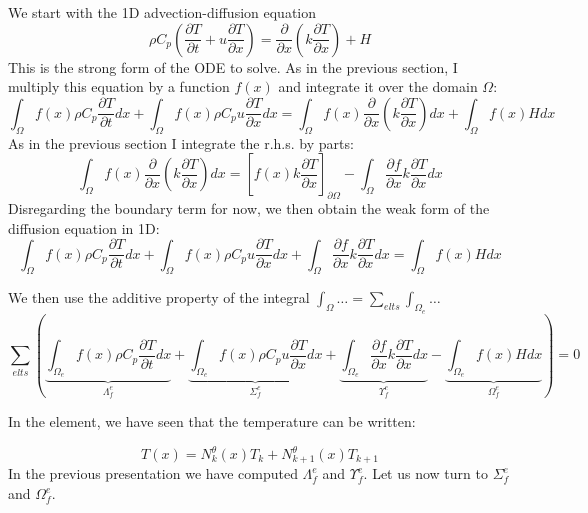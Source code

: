 
We start with the 1D advection-diffusion equation
\begin{equation}
\rho C_p \left( \frac{\partial T}{\partial t} 
+ u \frac{\partial T}{\partial x}
\right)
= \frac{\partial }{\partial x} \left( k \frac{\partial T}{\partial x}  \right)
+H
\end{equation}
This is the {\color{olive}strong form} of the ODE to solve.
As in the previous section, I multiply this equation by a function $f(x)$ and integrate it over 
the domain $\Omega$:
\[
\int_{\Omega} f(x)  \rho C_p\frac{\partial T}{\partial t} dx
+
\int_{\Omega} f(x)  \rho C_p u \frac{\partial T}{\partial x} dx
\!=\!
\int_{\Omega} f(x) \frac{\partial }{\partial x}\! \left(\! k\! \frac{\partial T}{\partial x}\!  \right)\! dx
+
\int_{\Omega} f(x) H dx 
\]
As in the previous section I integrate the r.h.s. by parts:
\[
\int_{\Omega} f(x) \frac{\partial }{\partial x} \left( k \frac{\partial T}{\partial x}  \right) dx
=
\left[
f(x) k \frac{\partial T}{\partial x}
\right]_{\partial \Omega}
-
\int_{\Omega} \frac{\partial f}{\partial x}  k \frac{\partial T}{\partial x}  dx
\]
Disregarding the boundary term for now, 
we then obtain the {\color{olive}weak form} of the diffusion equation in 1D:
\[
\boxed{
\int_{\Omega} f(x) \rho C_p \frac{\partial T}{\partial t} dx
+
\int_{\Omega} f(x)  \rho C_p u \frac{\partial T}{\partial x} dx
+
\int_{\Omega} \frac{\partial f}{\partial x}  k \frac{\partial T}{\partial x}  dx = 
\int_{\Omega} f(x) H dx 
}
\]

We then use the additive property of the integral $\int_\Omega \dots = \sum_{elts} \int_{\Omega_e} \dots$
\[
\sum_{elts} \left(     
\underbrace{ \int_{\Omega_e} f(x) \rho C_p   \frac{\partial T}{\partial t} dx }_{{\Lambda}_f^e}
+
\underbrace{  \int_{\Omega_e} f(x)  \rho C_p u \frac{\partial T}{\partial x} dx  }_{{\Sigma}_f^e}
+
\underbrace{\int_{\Omega_e} \frac{\partial f}{\partial x}  k \frac{\partial T}{\partial x}  dx}_{{\Upsilon}_f^e}    
- 
\underbrace{\int_{\Omega_e} f(x) H dx }_{{\Omega}_f^e}
  \right) = 0  
\]

In the element, we have seen that the temperature can be written:

\[
T(x) 
= N^\theta_{k}(x) T_k + N^\theta_{k+1}(x) T_{k+1}  
\]
In the previous presentation we have computed  ${\Lambda}_f^e$ and ${\Upsilon}_f^e$.
Let us now turn to ${\Sigma}_f^e$ and ${\Omega}_f^e$.

